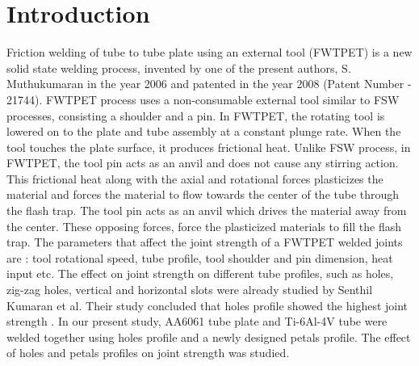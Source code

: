 \documentclass[3p]{elsarticle}
\begin{document}

\linenumbers
								
\section{Introduction}
\label{sec:Introduction}
Friction welding of tube to tube plate using an external tool (FWTPET) is a new solid state welding process, invented by one of the present authors, S. Muthukumaran in the year 2006 and patented in the year 2008 (Patent Number - 21744). FWTPET process uses a non-consumable external tool similar to FSW processes, consisting a shoulder and a pin.  In FWTPET, the rotating tool is lowered on to the plate and tube assembly at a constant plunge rate. When the tool touches the plate surface, it produces frictional heat. Unlike FSW process, in FWTPET, the tool pin acts as an anvil and does not cause any stirring action.   This frictional heat along with the axial and rotational forces plasticizes the material and forces the material to flow towards the center of the tube through the flash trap. The tool pin acts as an anvil which drives the material away from the center. These opposing forces, force the plasticized materials to fill the flash trap. The parameters that affect the joint strength of a FWTPET welded joints are : tool rotational speed, tube profile, tool shoulder and pin dimension, heat input etc. The effect on joint strength on different tube profiles, such as holes, zig-zag holes, vertical and horizontal slots were already studied by Senthil Kumaran et al. Their study concluded that holes profile showed the highest joint strength \cite{SenthilKumaran2013}. In our present study, AA6061 tube plate and Ti-6Al-4V tube were welded together using holes profile and a newly designed petals profile. The effect of holes and petals profiles on joint strength was studied.
\par
\end{document}
